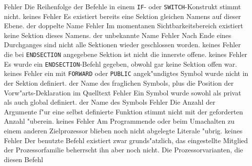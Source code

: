 \documentclass[12pt,a4paper,twoside]{report}
\newcommand{\tty}[1]{{\tt #1}}
\begin{document}
\begin{description}
               {Fehler}
               {Die Reihenfolge der Befehle in einem \tty{IF}-
	        oder \tty{SWITCH}-Konstrukt stimmt nicht.}
               {keines}
               {Fehler}
               {Es existiert bereits eine Sektion gleichen
                Namens auf dieser Ebene.}
               {der doppelte Name}
               {Fehler}
               {Im momentanen Sichtbarkeitsbereich existiert
                keine Sektion dieses Namens.}
               {der unbekannte Name}
               {Fehler}
               {Nach Ende eines Durchganges sind nicht alle
                Sektionen wieder geschlossen worden.}
               {keines}
               {Fehler}
               {die bei \tty{ENDSECTION} angegebene Sektion
	        ist nicht die innerste offene.}
               {keines}
               {Fehler}
               {Es wurde ein \tty{ENDSECTION}-Befehl gegeben, obwohl
                gar keine Sektion offen war.}
               {keines}
               {Fehler}
               {ein mit \tty{FORWARD} oder \tty{PUBLIC}
	        angek"undigtes Symbol wurde nicht in der Sektion definiert.}
               {der Name des fraglichen Symbols, plus die
                Position der Vorw"arts-Deklaration im Quelltext}
               {Fehler}
               {Ein Symbol wurde sowohl als privat als auch
                global definiert.}
               {der Name des Symbols}
               {Fehler}
               {Die Anzahl der Argumente f"ur eine
                selbst definierte Funktion stimmt nicht mit der geforderten
                Anzahl "uberein.}
               {keines}
               {Fehler}
               {Am Programmende oder beim Umachalten
                zu einem anderen Zielprozessor blieben noch nicht
                abgelegte Literale "ubrig.}
               {keines}
               {Fehler}
               {Der benutzte Befehl existiert zwar
                grunds"atzlich, das eingestellte Mitglied der
                Prozessorfamilie beherrscht ihn aber noch nicht.}
               {Die Prozessorvarianten, die diesen Befehl
}
\end{description}
\end{document}
